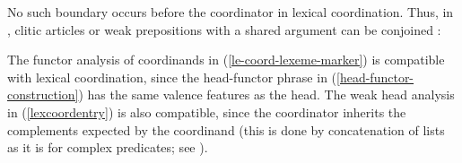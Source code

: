 \eal
\label{fr1}
\zl




No such boundary occurs before the coordinator in lexical coordination. Thus, in ,  clitic
articles or weak prepositions with a shared argument can be conjoined \citep[]{Abeille:06}:


\eal
{}
\zl

\noindent
The functor analysis of coordinands in (\ref{le-coord-lexeme-marker}) is compatible with lexical coordination, since the head-functor phrase in (\ref{head-functor-construction}) has the same valence features as the head. The weak head analysis in (\ref{lexcoordentry}) is also compatible, since the coordinator inherits the complements expected by the coordinand (this is done by concatenation of 
\comps lists as it is for complex predicates; see ).


                                                    
